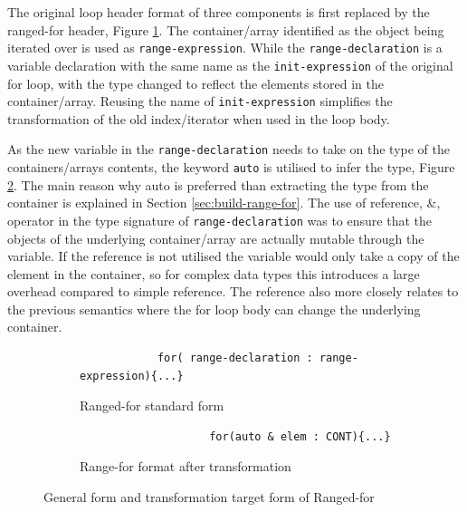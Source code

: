 \documentclass[bsc,frontabs,singlespacing,parskip,deptreport]{infthesis}
\begin{document}
The original loop header format of three components is first replaced by the ranged-for header, Figure \ref{fig:range-for-header-form}. The container/array identified as the object being iterated over is used as \texttt{range-expression}. While the \texttt{range-declaration} is a variable declaration with the same name as the \texttt{init-expression} of the original for loop, with the type changed to reflect the elements stored in the container/array. Reusing the name of \texttt{init-expression} simplifies the transformation of the old index/iterator when used in the loop body.
 
As the new variable in the \texttt{range-declaration} needs to take on the type of the containers/arrays contents, the keyword \texttt{auto} is utilised to infer the type, Figure \ref{fig:range-for-header}. The main reason why auto is preferred than extracting the type from the container is explained in Section \ref{sec:build-range-for}. The use of reference, \&, operator in the type signature of \texttt{range-declaration} was to ensure that the objects of the underlying container/array are actually mutable through the variable. If the reference is not utilised the variable would only take a copy of the element in the container, so for complex data types this introduces a large overhead compared to simple reference. The reference also more closely relates to the previous semantics where the for loop body can change the underlying container.
 
\begin{figure}[h]
    \centering
  
  \begin{subfigure}[h]{\textwidth}
        \centering
        \begin{verbatim}
            for( range-declaration : range-expression){...}
        \end{verbatim}
        \caption{Ranged-for standard form}
        \label{fig:range-for-header-form}
        \vspace{0.40cm}
    \end{subfigure}

    \begin{subfigure}[h]{\textwidth}
    \begin{verbatim}
                    for(auto & elem : CONT){...}
    \end{verbatim}
    \caption{Range-for format after transformation}
    \centering
    \label{fig:range-for-header}
    \end{subfigure}

    \caption{General form and transformation target form of Ranged-for}
    \label{fig:code-for-headers}
\end{figure}
\end{document}
